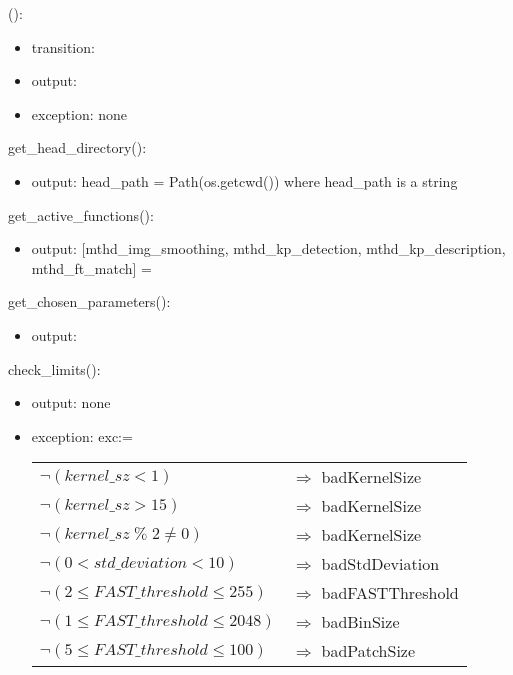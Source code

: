 \documentclass[12pt, titlepage]{article}
\begin{document}
\noindent {}():
\begin{itemize}
\item transition:  
\item output:  
\item exception: none 
\end{itemize}

\noindent get\_head\_directory():
\begin{itemize}
  \item output: head\_path = Path(os.getcwd()) where head\_path is a string
\end{itemize}


\noindent get\_active\_functions():
\begin{itemize}
  \item output: [mthd\_img\_smoothing, mthd\_kp\_detection, 
  mthd\_kp\_description, mthd\_ft\_match] = 
\end{itemize}


\noindent get\_chosen\_parameters():
\begin{itemize}
  \item output: 
\end{itemize}




\noindent check\_limits():
\begin{itemize}
  \item output: none
    
  \item exception: exc:=
  \noindent \begin{longtable*}[l]{l l} 
    $\neg (kernel\_sz < 1)$ & $\Rightarrow$ badKernelSize\\
    $\neg (kernel\_sz > 15)$ & $\Rightarrow$ badKernelSize\\
    $\neg (kernel\_sz \; \% \; 2 \neq 0)$ & $\Rightarrow$ badKernelSize\\
    $\neg (0 < std\_deviation < 10)$ & $\Rightarrow$ badStdDeviation\\
    $\neg (2 \leq FAST\_threshold \leq 255)$ & $\Rightarrow$ badFASTThreshold\\
    $\neg (1 \leq FAST\_threshold \leq 2048)$ & $\Rightarrow$ badBinSize\\
    $\neg (5 \leq FAST\_threshold \leq 100)$ & $\Rightarrow$ badPatchSize\\
    \end{longtable*}
\end{itemize}

\end{document}
